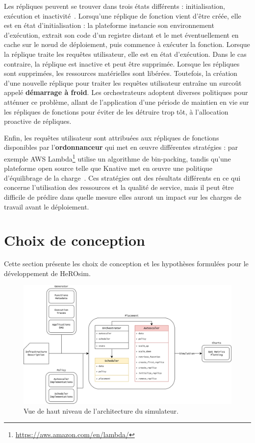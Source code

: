 Les répliques peuvent se trouver dans trois états différents : initialisation, exécution et inactivité~\cite{SchleierSmith2021WhatSC}. Lorsqu'une réplique de fonction vient d'être créée, elle est en état d'initialisation : la plateforme instancie son environnement d'exécution, extrait son code d'un registre distant et le met éventuellement en cache sur le nœud de déploiement, puis commence à exécuter la fonction. Lorsque la réplique traite les requêtes utilisateur, elle est en état d'exécution. Dans le cas contraire, la réplique est inactive et peut être supprimée. Lorsque les répliques sont supprimées, les ressources matérielles sont libérées. Toutefois, la création d'une nouvelle réplique pour traiter les requêtes utilisateur entraîne un surcoût appelé \textbf{démarrage à froid}. Les orchestrateurs adoptent diverses politiques pour atténuer ce problème, allant de l'application d'une période de maintien en vie sur les répliques de fonctions pour éviter de les détruire trop tôt, à l'allocation proactive de répliques.

Enfin, les requêtes utilisateur sont attribuées aux répliques de fonctions disponibles par l'\textbf{ordonnanceur} qui met en œuvre différentes stratégies : par exemple AWS Lambda\footnote{\href{https://aws.amazon.com/en/lambda/}{https://aws.amazon.com/en/lambda/}} utilise un algorithme de bin-packing, tandis qu'une plateforme open source telle que Knative met en œuvre une politique d'équilibrage de la charge~\cite{Lannurien2023}. Ces stratégies ont des résultats différents en ce qui concerne l'utilisation des ressources et la qualité de service, mais il peut être difficile de prédire dans quelle mesure elles auront un impact sur les charges de travail avant le déploiement.

\section{Choix de conception}
\label{section:herosim-herosim}

Cette section présente les choix de conception et les hypothèses formulées pour le développement de HeROsim.

\begin{figure}[t]
    \centering
    \includegraphics[width=\columnwidth]{7_Chapitre5/figures/software-architecture.png}
    \caption{Vue de haut niveau de l'architecture du simulateur.}
\label{figure:herosim-software-architecture}
\end{figure}

